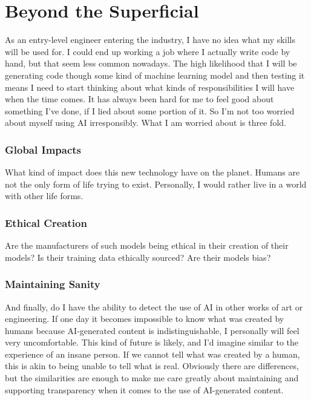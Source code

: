 \documentclass[sigconf, 12pt]{acmart}
\begin{document}
\section{Beyond the Superficial}
As an entry-level engineer entering the industry, I have no idea what my skills will be used for. I could end up working a job where I actually write code by hand, but that seem less common nowadays. The high likelihood that I will be generating code though some kind of machine learning model and then testing it means I need to start thinking about what kinds of responsibilities I will have when the time comes. It has always been hard for me to feel good about something I've done, if I lied about some portion of it. So I'm not too worried about myself using AI irresponsibly. What I am worried about is three fold.
\subsubsection{Global Impacts}
What kind of impact does this new technology have on the planet. Humans are not the only form of life trying to exist. Personally, I would rather live in a world with other life forms.
\subsubsection{Ethical Creation}
Are the manufacturers of such models being ethical in their creation of their models? Is their training data ethically sourced? Are their models bias?
\subsubsection{Maintaining Sanity}
And finally, do I have the ability to detect the use of AI in other works of art or engineering. If one day it becomes impossible to know what was created by humans because AI-generated content is indistinguishable, I personally will feel very uncomfortable. This kind of future is likely, and I'd imagine similar to the experience of an insane person. If we cannot tell what was created by a human, this is akin to being unable to tell what is real. Obviously there are differences, but the similarities are enough to make me care greatly about maintaining and supporting transparency when it comes to the use of AI-generated content.

{}

\end{document}
